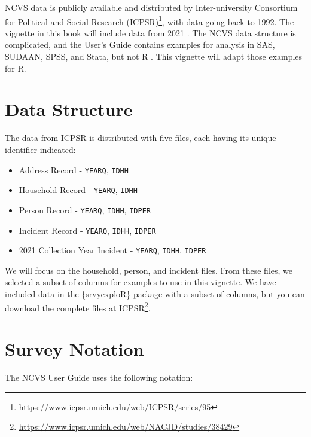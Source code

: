 \documentclass[
]{krantz}
\providecommand{\tightlist}{%
  \setlength{\itemsep}{0pt}\setlength{\parskip}{0pt}}
\begin{document}
NCVS data is publicly available and distributed by Inter-university Consortium for Political and Social Research (ICPSR)\footnote{\url{https://www.icpsr.umich.edu/web/ICPSR/series/95}}, with data going back to 1992. The vignette in this book will include data from 2021 \citep{ncvs_data_2021}. The NCVS data structure is complicated, and the User's Guide contains examples for analysis in SAS, SUDAAN, SPSS, and Stata, but not R \citep{ncvs_user_guide}. This vignette will adapt those examples for R.

\hypertarget{data-structure}{%
\section{Data Structure}\label{data-structure}}

The data from ICPSR is distributed with five files, each having its unique identifier indicated:

\begin{itemize}
\tightlist
\item
  Address Record - \texttt{YEARQ}, \texttt{IDHH}
\item
  Household Record - \texttt{YEARQ}, \texttt{IDHH}
\item
  Person Record - \texttt{YEARQ}, \texttt{IDHH}, \texttt{IDPER}
\item
  Incident Record - \texttt{YEARQ}, \texttt{IDHH}, \texttt{IDPER}
\item
  2021 Collection Year Incident - \texttt{YEARQ}, \texttt{IDHH}, \texttt{IDPER}
\end{itemize}

We will focus on the household, person, and incident files. From these files, we selected a subset of columns for examples to use in this vignette. We have included data in the \{srvyexploR\} package with a subset of columns, but you can download the complete files at ICPSR\footnote{\url{https://www.icpsr.umich.edu/web/NACJD/studies/38429}}.

\hypertarget{survey-notation}{%
\section{Survey Notation}\label{survey-notation}}

The NCVS User Guide \citep{ncvs_user_guide} uses the following notation:
\end{document}
